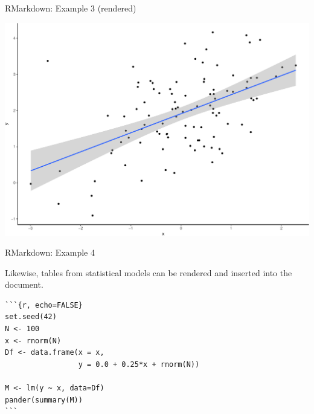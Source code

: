 \documentclass[10pt,ignorenonframetext,]{beamer}
\begin{document}
\begin{frame}{RMarkdown: Example 3 (rendered)}
\protect\hypertarget{rmarkdown-example-3-rendered}{}

\includegraphics{slides_files/figure-beamer/unnamed-chunk-20-1.pdf}

\end{frame}

\begin{frame}[fragile]{RMarkdown: Example 4}
\protect\hypertarget{rmarkdown-example-4}{}

Likewise, tables from statistical models can be rendered and inserted
into the document.

\begin{verbatim}
```{r, echo=FALSE}
set.seed(42)
N <- 100
x <- rnorm(N)
Df <- data.frame(x = x, 
                 y = 0.0 + 0.25*x + rnorm(N))

M <- lm(y ~ x, data=Df)
pander(summary(M))
```
\end{verbatim}

\end{frame}
\end{document}
